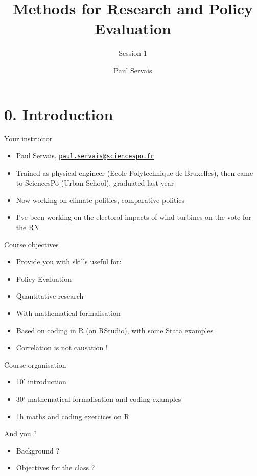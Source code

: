 \documentclass[
  ignorenonframetext,
]{beamer}
\title{Methods for Research and Policy Evaluation}
\subtitle{Session 1}
\author{Paul Servais}
\date{}
\providecommand{\tightlist}{%
  \setlength{\itemsep}{0pt}\setlength{\parskip}{0pt}}
\begin{document}
\frame{\titlepage}


\section{0. Introduction}\label{introduction}

\begin{frame}{Your instructor}
\label{your-instructor}
\begin{itemize}
\tightlist
\item
  Paul Servais,
  \href{mailto:paul.servais@sciencespo.fr}{\nolinkurl{paul.servais@sciencespo.fr}}.
\item
  Trained as physical engineer (Ecole Polytechnique de Bruxelles), then
  came to SciencesPo (Urban School), graduated last year
\item
  Now working on climate politics, comparative politics
\item
  I've been working on the electoral impacts of wind turbines on the
  vote for the RN
\end{itemize}
\end{frame}

\begin{frame}{Course objectives}
\label{course-objectives}
\begin{itemize}
\tightlist
\item
  Provide you with skills useful for:
\item
  Policy Evaluation
\item
  Quantitative research
\item
  With mathematical formalisation
\item
  Based on coding in R (on RStudio), with some Stata examples
\item
  Correlation is not causation !
\end{itemize}
\end{frame}

\begin{frame}{Course organisation}
\label{course-organisation}
\begin{itemize}
\tightlist
\item
  10' introduction
\item
  30' mathematical formalisation and coding examples
\item
  1h maths and coding exercices on R
\end{itemize}
\end{frame}

\begin{frame}{And you ?}
\label{and-you}
\begin{itemize}
\tightlist
\item
  Background ?
\item
  Objectives for the class ?
\end{itemize}
\end{frame}
\end{document}
